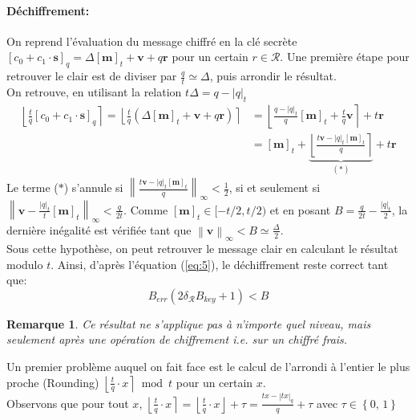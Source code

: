 \documentclass[11pt, headsepline, a4paper, fleqn, oneside]{article}
\newtheorem{rem}{Remarque}
\begin{document}
\paragraph{Déchiffrement:} 
On reprend l'évaluation du message chiffré en la clé secrète  $[c_{0}+c_{1} \cdot \boldsymbol{s}]_{q} = \Delta[\boldsymbol{m}]_{t}+\boldsymbol{v}+q \boldsymbol{r}$ pour un certain $r\in\mathcal{R}$. Une première étape pour retrouver le clair est de diviser par $\frac{q}{t} \simeq \Delta$, puis arrondir le résultat.\\
On retrouve, en utilisant la relation $t\Delta = q - |q|_{t}$
$$\begin{aligned}
\left\lfloor\frac{t}{q}\left[c_{0}+c_{1} \cdot \boldsymbol{s}\right]_{q}\right\rceil=\left\lfloor\frac{t}{q}\left(\Delta[\boldsymbol{m}]_{t}+\boldsymbol{v}+q \boldsymbol{r}\right)\right\rceil &= \left\lfloor\frac{q-|q|_{t}}{q}[\boldsymbol{m}]_{t}+\frac{t}{q} \boldsymbol{v} \right\rceil+t \boldsymbol{r} \\ &= [\boldsymbol{m}]_{t}+ \underbrace{\left\lfloor\frac{t \boldsymbol{v}-|q|_{t}[\boldsymbol{m}]_{t}}{q}\right\rceil}_\text{$(*)$}  +t \boldsymbol{r}
\end{aligned}$$
Le terme ($*$) s'annule si $\left\|\frac{t \boldsymbol{v}-|q|_{t}[\boldsymbol{m}]_{t}}{q}\right\|_{\infty}<\frac{1}{2}$, si et seulement si $\left\|\boldsymbol{v}-\frac{|q|_{t}}{t}[\boldsymbol{m}]_{t}\right\|_{\infty}<\frac{q}{2 t}$. Comme $[\boldsymbol{m}]_{t}\in[-t / 2, t / 2) $ et en posant $B = \frac{q}{2t} - \frac{|q|_{t}}{2}$, la dernière inégalité est vérifiée tant que $\left\|\boldsymbol{v}\right\|_{\infty}< B \simeq \frac{\Delta}{2}$. \\
Sous cette hypothèse, on peut retrouver le message clair en calculant le résultat modulo $t$. Ainsi, d'après l'équation (\ref{eq:5}), le déchiffrement reste correct tant que:
\begin{equation} \label{eq:6}
    B_{err}(2\delta_{\mathcal{R}} B_{key} +1) < B
\end{equation}
\begin{rem}
Ce résultat ne s'applique pas à n'importe quel niveau, mais seulement après une opération de chiffrement i.e. sur un chiffré \og frais\fg.
\end{rem}
Un premier problème auquel on fait face est le calcul de l'arrondi à l'entier le plus proche (Rounding) $\left\lfloor\frac{t}{q} \cdot x \right\rceil \bmod t$ pour un certain $x$.\\
Observons que pour tout $x$, $\left\lfloor\frac{t}{q} \cdot x\right\rceil = \left\lfloor\frac{t}{q} \cdot x\right\rfloor + \tau = \frac{tx-|tx|_q}{q} + \tau$ avec $\tau \in \left\{0,\,1\right\}$
\end{document}
